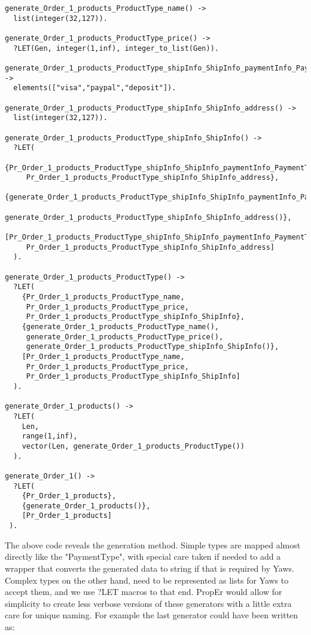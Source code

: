 \documentclass[submission,copyright,a4]{eptcs}
\begin{document}
\begin{lstlisting}
generate_Order_1_products_ProductType_name() -> 
  list(integer(32,127)).

generate_Order_1_products_ProductType_price() ->  
  ?LET(Gen, integer(1,inf), integer_to_list(Gen)).

generate_Order_1_products_ProductType_shipInfo_ShipInfo_paymentInfo_PaymentType() -> 
  elements(["visa","paypal","deposit"]).

generate_Order_1_products_ProductType_shipInfo_ShipInfo_address() -> 
  list(integer(32,127)).

generate_Order_1_products_ProductType_shipInfo_ShipInfo() -> 
  ?LET(
    {Pr_Order_1_products_ProductType_shipInfo_ShipInfo_paymentInfo_PaymentType,
     Pr_Order_1_products_ProductType_shipInfo_ShipInfo_address},
    {generate_Order_1_products_ProductType_shipInfo_ShipInfo_paymentInfo_PaymentType(),
     generate_Order_1_products_ProductType_shipInfo_ShipInfo_address()},
    [Pr_Order_1_products_ProductType_shipInfo_ShipInfo_paymentInfo_PaymentType,
     Pr_Order_1_products_ProductType_shipInfo_ShipInfo_address]
  ).

generate_Order_1_products_ProductType() -> 
  ?LET(
    {Pr_Order_1_products_ProductType_name, 
     Pr_Order_1_products_ProductType_price, 
     Pr_Order_1_products_ProductType_shipInfo_ShipInfo},
    {generate_Order_1_products_ProductType_name(), 
     generate_Order_1_products_ProductType_price(), 
     generate_Order_1_products_ProductType_shipInfo_ShipInfo()},
    [Pr_Order_1_products_ProductType_name, 
     Pr_Order_1_products_ProductType_price, 
     Pr_Order_1_products_ProductType_shipInfo_ShipInfo] 
  ).

generate_Order_1_products() -> 
  ?LET(
    Len, 
    range(1,inf), 
    vector(Len, generate_Order_1_products_ProductType())
  ).

generate_Order_1() -> 
  ?LET(
    {Pr_Order_1_products},
    {generate_Order_1_products()},
    [Pr_Order_1_products]
 ).
\end{lstlisting}

The above code reveals the generation method. Simple types are mapped almost directly like the "PaymentType", with special care taken if needed to add a wrapper that converts the generated data to string if that is required by Yaws. Complex types on the other hand, need to be represented as lists for Yaws to accept them, and we use ?LET macros to that end. 
PropEr would allow for simplicity to create less verbose versions of these generators with a little extra care for unique naming. For example the last generator could have been written as:
\end{document}
